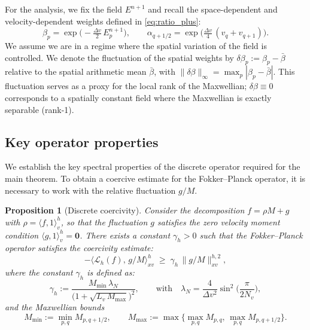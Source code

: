 \documentclass[]{article}
\numberwithin{equation}{section}
\newtheorem{proposition}[theorem]{Proposition}
\newcommand{\modifyfirst}[1]{#1}
\begin{document}
For the analysis, we fix the field $E^{n+1}$ and recall the space-dependent and velocity-dependent weights defined in \eqref{eq:ratio_plus}:
\begin{equation}\label{eq:AP_weights}
  \beta_p = \exp \Big(-\tfrac{\Delta v}{2}\,E^{n+1}_p\Big), \qquad \alpha_{q+1/2} = \exp \Big(\tfrac{\Delta v}{4}\,(v_q+v_{q+1})\Big).
\end{equation}
We assume we are in a regime where the spatial variation of the field is controlled. We denote the fluctuation of the spatial weights by $\delta \beta_p := \beta_p - \bar{\beta}$ relative to the spatial arithmetic mean $\bar{\beta}$, with $\|\delta \beta\|_\infty = \max_p |\beta_p - \bar{\beta}|$. This fluctuation serves as a proxy for the local rank of the Maxwellian; $\delta \beta \equiv 0$ corresponds to a spatially constant field where the Maxwellian is exactly separable (rank-1).

\subsection{Key operator properties}
\label{sec:aux_lemmas}
We establish the key spectral properties of the discrete operator required for the main theorem. To obtain a coercive estimate for the Fokker--Planck operator, it is necessary to work with the relative fluctuation $g/M$.

\begin{proposition}[Discrete coercivity]
\label{prop:coercivity}
Consider the decomposition $f = \rho M + g$ \modifyfirst{with $\rho=\langle f,1\rangle_v^h$, so that the fluctuation $g$ satisfies the zero velocity moment condition $\langle g, 1 \rangle_v^h = \mathbf{0}$}. There exists a constant $\gamma_h > 0$ such that the Fokker--Planck operator satisfies the coercivity estimate:
\begin{equation}
  -\big\langle \mathcal L_{h}(f),\, g/M \big\rangle_{xv}^h \;\ge\; \gamma_h\,\big\| g/M \big\|_{xv}^{h,2},
\end{equation}
where the constant $\gamma_h$ is defined as:
\begin{equation}
  \gamma_h:=\frac{M_{\min}\,\lambda_N}{\Big(1+\sqrt{{L_v\,M_{\max}}}\Big)^2}, \qquad \text{with} \quad \lambda_N=\frac{4}{\Delta v^2}\sin^2\!\Big(\frac{\pi}{2N_v}\Big),
\end{equation}
and the Maxwellian bounds
\[
  M_{\min}:=\min_{p,q} M_{p,q+1/2},
  \qquad
  M_{\max}:=\max\!\Big\{ \max_{p,q} M_{p,q},\, \max_{p,q} M_{p,q+1/2}\Big\}.
\]
\end{proposition}
\end{document}
